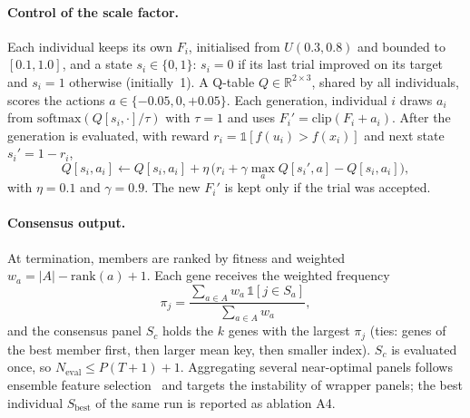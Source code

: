 \paragraph{Control of the scale factor.} Each individual keeps its own $F_i$, initialised from $U(0.3,0.8)$ and bounded to
$[0.1,1.0]$, and a state $s_i\in\{0,1\}$: $s_i=0$ if its last trial improved on its target and $s_i=1$ otherwise (initially~1).
A Q-table $Q\in\mathbb{R}^{2\times3}$, shared by all individuals, scores the actions $a\in\{-0.05,0,+0.05\}$. Each generation,
individual $i$ draws $a_i$ from $\mathrm{softmax}(Q[s_i,\cdot]/\tau)$ with $\tau=1$ and uses $F_i'=\mathrm{clip}(F_i+a_i)$. After
the generation is evaluated, with reward $r_i=\mathbb{1}[f(u_i)>f(x_i)]$ and next state $s_i'=1-r_i$,
\begin{equation}\label{eq:q}
  Q[s_i,a_i]\leftarrow Q[s_i,a_i]+\eta\,\big(r_i+\gamma\max_{a}Q[s_i',a]-Q[s_i,a_i]\big),
\end{equation}
with $\eta=0.1$ and $\gamma=0.9$. The new $F_i'$ is kept only if the trial was accepted.

\paragraph{Consensus output.} At termination, members are ranked by fitness and weighted $w_a=|A|-\mathrm{rank}(a)+1$. Each gene
receives the weighted frequency
\begin{equation}\label{eq:consensus}
  \pi_j=\frac{\sum_{a\in A}w_a\,\mathbb{1}[j\in S_a]}{\sum_{a\in A}w_a},
\end{equation}
and the consensus panel $S_c$ holds the $k$ genes with the largest $\pi_j$ (ties: genes of the best member first, then larger
mean key, then smaller index). $S_c$ is evaluated once, so $N_{\mathrm{eval}}\le P(T+1)+1$. Aggregating several near-optimal
panels follows ensemble feature selection~\cite{abeel2010,meinshausen2010} and targets the instability of wrapper panels; the
best individual $S_{\mathrm{best}}$ of the same run is reported as ablation A4.

